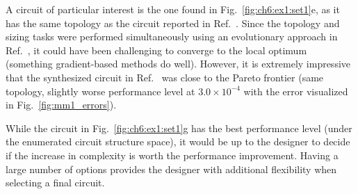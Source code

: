 

A circuit of particular interest is the one found in Fig.~\ref{fig:ch6:ex1:set1}e, as it has the same topology as the circuit reported in Ref.~\cite{Grimbleby1995a}.
Since the topology and sizing tasks were performed simultaneously using an evolutionary approach in Ref.~\cite{Grimbleby1995a}, it could have been challenging to converge to the local optimum (something gradient-based methods do well).
However, it is extremely impressive that the synthesized circuit in Ref.~\cite{Grimbleby1995a} was close to the Pareto frontier (same topology, slightly worse performance level at $3.0 \times 10^{-4}$ with the error visualized in Fig.~\ref{fig:mm1_errors}).

While the circuit in Fig.~\ref{fig:ch6:ex1:set1}g has the best performance level (under the enumerated circuit structure space), it would be up to the designer to decide if the increase in complexity is worth the performance improvement.
Having a large number of options provides the designer with additional flexibility when selecting a final circuit.